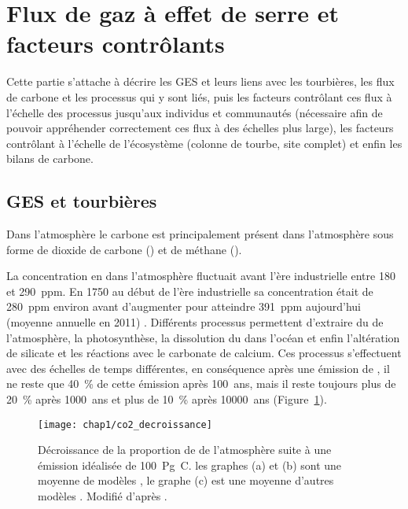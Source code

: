 
\section{Flux de gaz à effet de serre et facteurs contrôlants}

Cette partie s'attache à décrire les GES et leurs liens avec les tourbières, les flux de carbone et les processus qui y sont liés, puis les facteurs contrôlant ces flux à l'échelle des processus jusqu'aux individus et communautés (nécessaire afin de pouvoir appréhender correctement ces flux à des échelles plus large), les facteurs contrôlant à l'échelle de l'écosystème (colonne de tourbe, site complet) et enfin les bilans de carbone.


\subsection{GES et tourbières}

Dans l'atmosphère le carbone est principalement présent dans l'atmosphère sous forme de dioxide de carbone (\coo) et de méthane (\chh).

La concentration en \coo dans l'atmosphère fluctuait avant l'ère industrielle entre 180 et \SI{290}{ppm}.
En 1750 au début de l'ère industrielle sa concentration était de \SI{280}{ppm} environ avant d'augmenter pour atteindre \SI{391}{ppm} aujourd'hui (moyenne annuelle en 2011) \citep{Ciais2014}.
Différents processus permettent d'extraire du \coo de l'atmosphère, la photosynthèse, la dissolution du \coo dans l'océan et enfin l'altération de silicate et les réactions avec le carbonate de calcium.
Ces processus s'effectuent avec des échelles de temps différentes, en conséquence après une émission de \coo, il ne reste que \SI{40}{\percent} de cette émission après \SI{100}{ans}, mais il reste toujours plus de \SI{20}{\percent} après \SI{1000}{ans} et plus de \SI{10}{\percent} après \SI{10000}{ans} \citep{joos2013,Ciais2014} (Figure~\ref{fig:co2_decroissance}).

\begin{figure}
\centering
\texttt{[image: chap1/co2\_decroissance]}
\caption{Décroissance de la proportion de \coo de l'atmosphère suite à une émission idéalisée de \SI{100}{\peta\gram C}. les graphes (a) et (b) sont une moyenne de modèles \citep{joos2013}, le graphe (c) est une moyenne d'autres modèles \citep{archer2009}. Modifié d'après \citep{Ciais2014}.}
\label{fig:co2_decroissance}
\end{figure}



